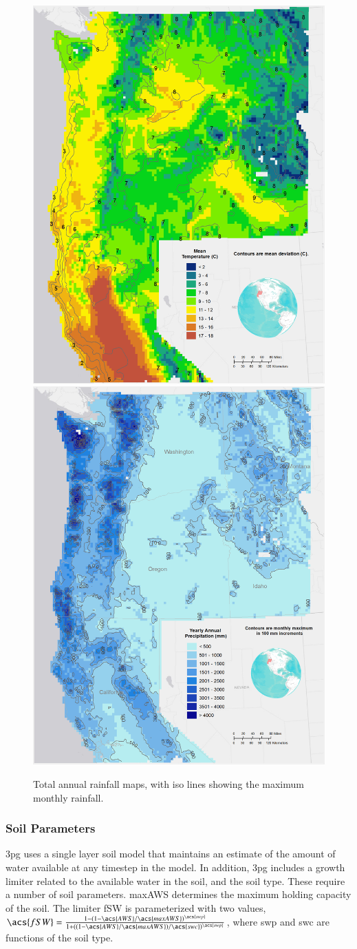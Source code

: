 \documentclass[preprint,12pt]{elsarticle}
\begin{document}
\begin{figure}[hp]
  \centering  
  \includegraphics[width=0.45\linewidth]{dailytemp}  
  \includegraphics[width=0.45\linewidth]{precip}  
\caption{Total annual rainfall maps, with iso lines showing the maximum monthly rainfall.}
  \label{fig:temp}
\end{figure}

\subsubsection{Soil Parameters}
\label{sec:soil}

\ac{3pg} uses a single layer soil model that maintains an estimate of
the amount of water available at any timestep in the model.  In
addition, \ac{3pg} includes a growth limiter related to the available
water in the soil, and the soil type.  These require a number of soil
parameters.  \ac{maxAWS} determines the maximum holding capacity of
the soil.  The limiter \ac{fSW} is parameterized with two values,
$\acs{fSW} = \frac{1-(1-\acs{AWS}/\acs{maxAWS})^{\acs{swp}}}{1+((1-\acs{AWS}/\acs{maxAWS})/\acs{swc})^{\acs{swp}}}$, 
where \ac{swp} and \ac{swc} are functions of the soil type.
\end{document}
